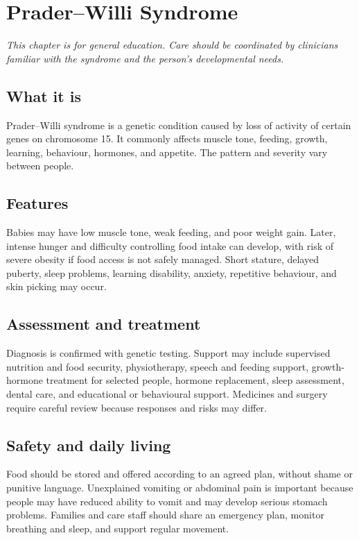 \chapter{Prader--Willi Syndrome}

\medskip
\noindent\textit{This chapter is for general education. Care should be coordinated by clinicians familiar with the syndrome and the person’s developmental needs.}

\section*{What it is}
Prader--Willi syndrome is a genetic condition caused by loss of activity of certain genes on chromosome 15. It commonly affects muscle tone, feeding, growth, learning, behaviour, hormones, and appetite. The pattern and severity vary between people.

\section*{Features}
Babies may have low muscle tone, weak feeding, and poor weight gain. Later, intense hunger and difficulty controlling food intake can develop, with risk of severe obesity if food access is not safely managed. Short stature, delayed puberty, sleep problems, learning disability, anxiety, repetitive behaviour, and skin picking may occur.

\section*{Assessment and treatment}
Diagnosis is confirmed with genetic testing. Support may include supervised nutrition and food security, physiotherapy, speech and feeding support, growth-hormone treatment for selected people, hormone replacement, sleep assessment, dental care, and educational or behavioural support. Medicines and surgery require careful review because responses and risks may differ.

\section*{Safety and daily living}
Food should be stored and offered according to an agreed plan, without shame or punitive language. Unexplained vomiting or abdominal pain is important because people may have reduced ability to vomit and may develop serious stomach problems. Families and care staff should share an emergency plan, monitor breathing and sleep, and support regular movement.

